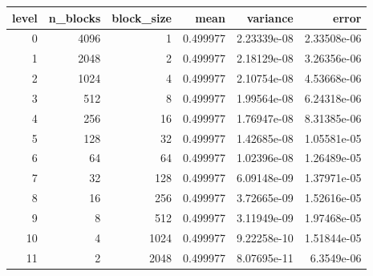 \begin{tabular}{rrrrrr}
\toprule
level & n_blocks & block_size & mean & variance & error \\
\midrule
0 & 4096 & 1 & 0.499977 & 2.23339e-08 & 2.33508e-06 \\
1 & 2048 & 2 & 0.499977 & 2.18129e-08 & 3.26356e-06 \\
2 & 1024 & 4 & 0.499977 & 2.10754e-08 & 4.53668e-06 \\
3 & 512 & 8 & 0.499977 & 1.99564e-08 & 6.24318e-06 \\
4 & 256 & 16 & 0.499977 & 1.76947e-08 & 8.31385e-06 \\
5 & 128 & 32 & 0.499977 & 1.42685e-08 & 1.05581e-05 \\
6 & 64 & 64 & 0.499977 & 1.02396e-08 & 1.26489e-05 \\
7 & 32 & 128 & 0.499977 & 6.09148e-09 & 1.37971e-05 \\
8 & 16 & 256 & 0.499977 & 3.72665e-09 & 1.52616e-05 \\
9 & 8 & 512 & 0.499977 & 3.11949e-09 & 1.97468e-05 \\
10 & 4 & 1024 & 0.499977 & 9.22258e-10 & 1.51844e-05 \\
11 & 2 & 2048 & 0.499977 & 8.07695e-11 & 6.3549e-06 \\
\bottomrule
\end{tabular}
